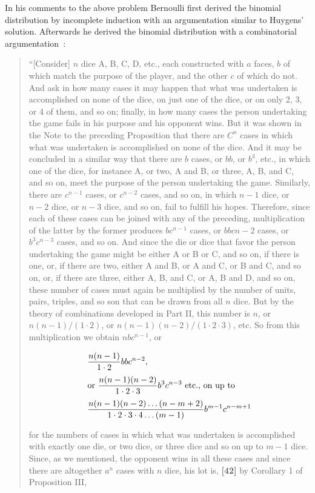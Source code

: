 In his comments to the above problem Bernoulli first derived the binomial distribution by incomplete induction with an argumentation similar to Huygens' solution. Afterwards he derived the binomial distribution with a combinatorial argumentation~\cite[pp. 165-167]{bernoulli}:

\begin{quotation}
  ``[Consider] $n$ dice A, B, C, D, etc., each constructed with $a$ faces, $b$ of which match the purpose of the player, and the other $c$ of which do not. And ask in how many cases it may happen that what was undertaken is accomplished on none of the dice, on just one of the dice, or on only 2, 3, or 4 of them, and so on; finally, in how many cases the person undertaking the game fails in his purpose and his opponent wins. But it was shown in the Note to the preceding Proposition that there are $C^n$ cases in which what was undertaken is accomplished on none of the dice. And it may be concluded in a similar way that there are $b$ cases, or $bb$, or $b^3$, etc., in which one of the dice, for instance A, or two, A and B, or three, A, B, and C, and so on, meet the purpose of the person undertaking the game. Similarly, there are $c^{n-1}$ cases, or $c^{n-2}$ cases, and so on, in which $n-1$ dice, or $n-2$ dice, or $n-3$ dice, and so on, fail to fulfill his hopes. Therefore, since each of these cases can be joined with any of the preceding, multiplication of the latter by the former produces $bc^{n-1}$ cases, or $bbc{n-2}$ cases, or $b^3c^{n-3}$ cases, and so on. And since the die or dice that favor the person undertaking the game might be either A or B or C, and so on, if there is one, or, if there are two, either A and B, or A and C, or B and C, and so on, or, if there are three, either A, B, and C, or A, B and D, and so on, these number of cases must again be multiplied by the number of units, pairs, triples, and so son that can be drawn from all $n$ dice. But by the theory of combinations developed in Part II, this number is $n$, or $n(n-1)/(1\cdot 2)$, or $n(n-1)(n-2)/(1\cdot 2\cdot 3)$, etc. So from this multiplication we obtain $nbc^{n-1}$, or

  \begin{align*}
      & \frac{n(n-1)}{1\cdot 2}bbc^{n-2}, \nl
      & \text{or } \frac{n(n-1)(n-2)}{1\cdot 2\cdot 3}b^3c^{n-3} \text{ etc., on up to} \nl
      & \frac{n(n-1)(n-2)\ldots(n-m+2)}{1\cdot 2\cdot 3\cdot 4\ldots(m-1)} b^{m-1} c^{n-m+1}
  \end{align*}

  for the numbers of cases in which what was undertaken is accomplished with exactly one die, or two dice, or three dice and so on up to $m-1$ dice. Since, as we mentioned, the opponent wins in all these cases and since there are altogether $a^n$ cases with $n$ dice, his lot is, \textbf{[42]} by Corollary 1 of Proposition III,


\end{quotation}
